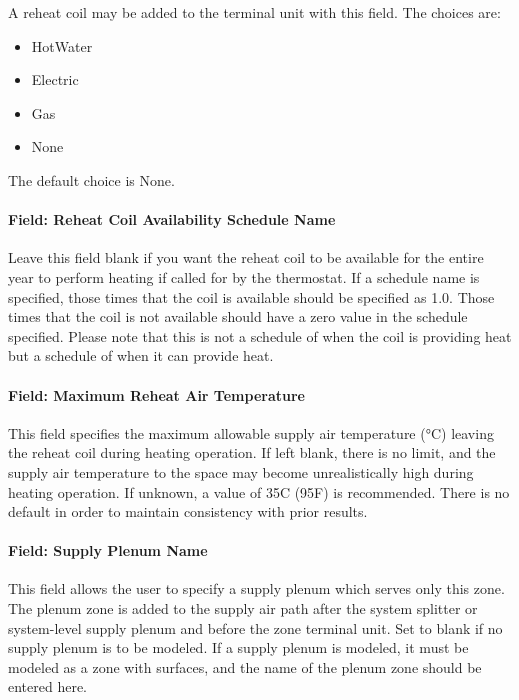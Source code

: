 A reheat coil may be added to the terminal unit with this field. The choices are:

\begin{itemize}
\item
  HotWater
\item
  Electric
\item
  Gas
\item
  None
\end{itemize}

The default choice is None.

\paragraph{Field: Reheat Coil Availability Schedule Name}\label{field-reheat-coil-availability-schedule-name-3}

Leave this field blank if you want the reheat coil to be available for the entire year to perform heating if called for by the thermostat. If a schedule name is specified, those times that the coil is available should be specified as 1.0. Those times that the coil is not available should have a zero value in the schedule specified. Please note that this is not a schedule of when the coil is providing heat but a schedule of when it can provide heat.

\paragraph{Field: Maximum Reheat Air Temperature}\label{field-maximum-reheat-air-temperature-2-000}

This field specifies the maximum allowable supply air temperature (°C) leaving the reheat coil during heating operation. If left blank, there is no limit, and the supply air temperature to the space may become unrealistically high during heating operation. If unknown, a value of 35C (95F) is recommended. There is no default in order to maintain consistency with prior results.

\paragraph{Field: Supply Plenum Name}\label{field-supply-plenum-name-4}

This field allows the user to specify a supply plenum which serves only this zone. The plenum zone is added to the supply air path after the system splitter or system-level supply plenum and before the zone terminal unit. Set to blank if no supply plenum is to be modeled. If a supply plenum is modeled, it must be modeled as a zone with surfaces, and the name of the plenum zone should be entered here.

